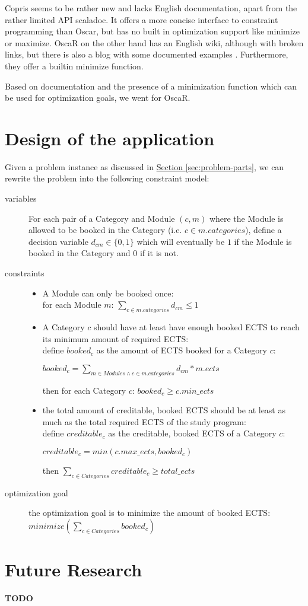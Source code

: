 \documentclass[a4paper]{article}
\begin{document}
Copris seems to be rather new and lacks English documentation, apart from the rather limited API scaladoc.
It offers a more concise interface to constraint programming than Oscar, but has no built in optimization support like minimize or maximize.
OscaR on the other hand has an English wiki, although with broken links, but there is also a blog with some documented examples \cite{hakank}.
Furthermore, they offer a builtin minimize function.


Based on documentation and the presence of a minimization function which can be used for optimization goals, we went for OscaR.


\section{Design of the application}
\label{sec:constraint-model}
Given a problem instance as discussed in
\hyperref[sec:problem-parts]{Section \ref*{sec:problem-parts}}, 
we can rewrite the problem into the following constraint model:
\begin{description}
\item[variables]
	For each pair of a Category and Module $(c,m)$ where the Module is allowed to be booked in the Category (i.e. $c\in m.categories$), define a decision variable $d_{cm}\in\{0,1\}$ which will eventually be $1$ if the Module is booked in the Category and $0$ if it is not.

\item[constraints]\hspace*{1em}
\begin{itemize}
	\item
	A Module can only be booked once:  
	\\for each Module $m$: $\sum_{c\in m.categories}d_{cm}\leq 1$

	\item
	A Category $c$ should have at least have enough booked ECTS to reach its minimum amount of required ECTS:
	\\ define $booked_c$ as the amount of ECTS booked for a Category $c$:
	
	$booked_c=\sum_{m\in Modules\wedge c\in m.categories} d_{cm}*m.ects$

	then for each Category $c$: $booked_c \geq c.min\_ects$

	\item the total amount of creditable, booked ECTS should be at least as much as the total required ECTS of the study program:
	\\define $creditable_c$ as the creditable, booked ECTS of a Category $c$:
	
	$creditable_c=min(c.max\_ects, booked_c)$

	then $\sum_{c\in Categories}creditable_c  \geq total\_ects$
\end{itemize}

\item[optimization goal]
	the optimization goal is to minimize the amount of booked ECTS:
	 $minimize(\sum_{c\in Categories}booked_c)$
\end{description}


\section{Future Research}
\label{sec:future}
\textbf{TODO}

\printbibliography
\end{document}
